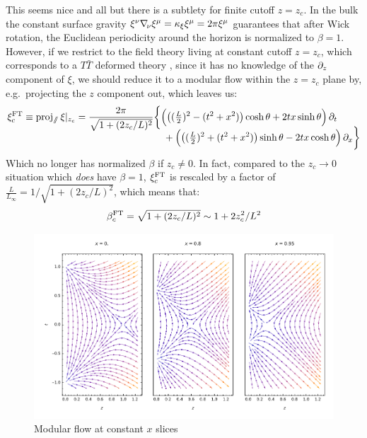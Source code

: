 \documentclass[11pt,a4paper]{article}
\begin{document}
	This seems nice and all but there is a subtlety for finite cutoff $z = z_c$. 
	In the bulk the constant surface gravity $
		\xi^\nu \nabla_{\!\mathnormal{\nu}} \xi^\mu
		= \kappa_\xi \xi^\mu
		= 2\pi \xi^\mu
	$ guarantees that after Wick rotation, the Euclidean periodicity around the horizon is normalized to $\beta = 1$. However, if we restrict to the field theory living at constant cutoff $z = z_c$, which corresponds to a $T\bar{T}$ deformed theory \cite{McGough:2016lol,Lewkowycz:2019xse} , since it has no knowledge of the $\partial_{z}$ component of $\xi$, we should reduce it to a modular flow within the $z = z_c$ plane by, e.g.~projecting the $z$ component out, which leaves us:
	\begin{equation}
	\begin{aligned}
		\xi^{\mrm{FT}}_c
		\equiv \proj{\sslash} \xi|_{z_c}
		= \frac{2\pi}{
				\sqrt{1 + (2z_c/L)^2}
			}
		& \bigg\{
			\pqty\Big{
				\pqty{
					(\tfrac{L}{2})^2
					- (t^2 + x^2)
				} \cosh\theta
				+ 2tx \sinh\theta
			} \,\pdd{t}
		\\[-2ex] &\quad 
			+ \pqty\Big{
				\pqty{
					(\tfrac{L}{2})^2
					+ (t^2 + x^2)
				} \sinh\theta
				- 2tx \cosh\theta
			} \,\pdd{x}
		\bigg\}
	\end{aligned}
	\end{equation}
	Which no longer has normalized $\beta$ if $z_c \ne 0$. In fact, compared to the $z_c \to 0$ situation which \textit{does} have $\beta = 1$, $\xi^{\mathrm{FT}}_c$ is rescaled by a factor of $
		\frac{L}{L_\infty}
		= 1/\sqrt{1 + (2z_c/L)^2}
	$, which means that:
	\begin{equation}
		\beta^{\mathrm{FT}}_c
		= \sqrt{1 + (2z_c/L)^2}
		\sim 1 + 2z_c^2 / L^2
	\end{equation}
	
	\begin{figure}[!ht]
	\vspace{-1.5ex}
	\centering
	\includegraphics[width=.8\linewidth]{img/modFlowXsection.pdf}
	\hspace{2em}
	\vspace{-2ex}
	\caption{Modular flow at constant $x$ slices}
	\end{figure}
	
\end{document}
